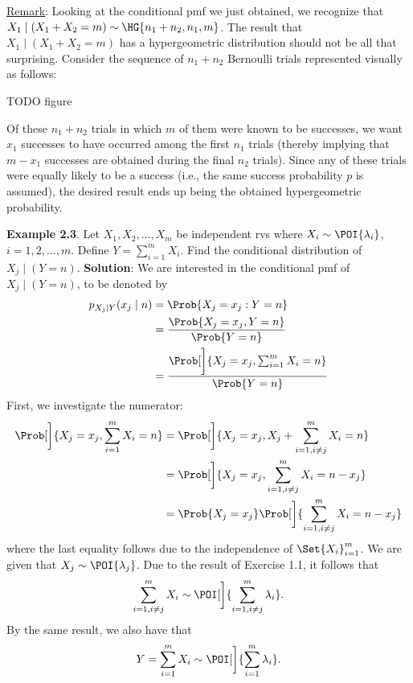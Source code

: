 \underline{Remark}: Looking at the conditional pmf we just obtained, we recognize that $ X_1\mid(X_1+X_2=m)\sim \HG{n_1+n_2,n_1,m} $.
The result that $ X_1\mid(X_1+X_2=m) $ has a hypergeometric distribution should not be all that surprising. Consider the sequence of $ n_1+n_2 $
Bernoulli trials represented visually as follows:

TODO figure

Of these $ n_1+n_2 $ trials in which $ m $ of them were known to be successes, we want $ x_1 $ successes to have occurred among the first $ n_1 $
trials (thereby implying that $ m-x_1 $ successes are obtained during the final $ n_2 $ trials). Since any of these trials were equally likely to be a success
(i.e., the same success probability $p$ is assumed), the desired result ends up being the obtained
hypergeometric probability.
\begin{Example}{}
    \textbf{Example 2.3}. Let $ X_1,X_2,\ldots,X_m $ be independent rvs where $ X_i \sim \POI{\lambda_i} $, $ i=1,2,\ldots,m $. Define
    $ Y=\sum_{i=1}^{m} X_i $. Find the conditional distribution of $ X_j\mid(Y=n) $.
    \tcblower{}
    \textbf{Solution}: We are interested in the conditional pmf of $ X_j\mid(Y=n) $, to be denoted by
    \begin{align*}
        p_{X_j\mid Y}(x_j\mid n)
         & =\Prob{X_j=x_j\given Y=n}                                      \\
         & =\frac{\Prob{X_j=x_j, Y=n}}{\Prob{Y=n}}                        \\
         & =\frac{\Prob[\bigg]{X_j=x_j,\sum_{i=1}^{m} X_i=n}}{\Prob{Y=n}}
    \end{align*}
    First, we investigate the numerator:
    \begin{align*}
        \Prob[\bigg]{X_j=x_j,\sum_{i=1}^{m} X_i=n}
         & =\Prob[\bigg]{X_j=x_j,X_j+\sum_{i=1,i\ne j}^m X_i=n}         \\
         & =\Prob[\bigg]{X_j=x_j,\sum_{i=1,i\ne j}^m X_i=n-x_j}         \\
         & =\Prob{X_j=x_j}\Prob[\bigg]{\sum_{i=1,i\ne j}^{m} X_i=n-x_j}
    \end{align*}
    where the last equality follows due to the independence of $ \Set{X_i}_{i=1}^m $. We are given that
    $ X_j \sim \POI{\lambda_j} $. Due to the result of Exercise 1.1, it follows that
    \[ \sum_{i=1,i\ne j}^{m} X_i \sim \POI[\bigg]{\sum_{i=1,i\ne j}^{m} \lambda_i}. \]
    By the same result, we also have that
    \[ Y=\sum_{i=1}^{m} X_i \sim \POI[\bigg]{\sum_{i=1}^{m} \lambda_i}. \]

\end{Example}
